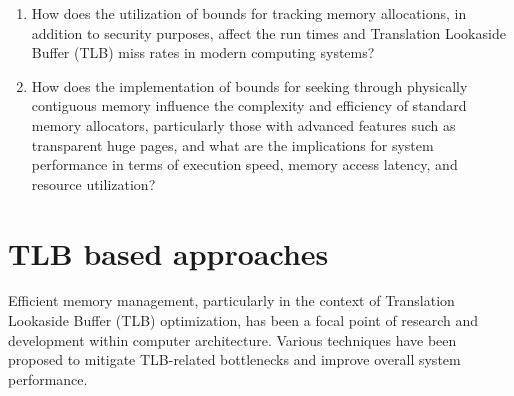 \begin{enumerate}
    \item How does the utilization of bounds for tracking memory allocations, in addition to security purposes, affect the 
    run times and Translation Lookaside Buffer (TLB) miss rates in modern computing systems?
    \item How does the implementation of bounds for seeking through physically contiguous memory influence the complexity and 
    efficiency of standard memory allocators, particularly those with advanced features such as transparent 
    huge pages, and what are the implications for system performance in terms of execution speed, memory access 
    latency, and resource utilization?
  \end{enumerate}

\section{TLB based approaches}
Efficient memory management, particularly in the context of 
Translation Lookaside Buffer (TLB) optimization, has been a focal point of 
research and development within computer architecture. Various techniques have been 
proposed to mitigate TLB-related bottlenecks and improve overall system performance.

